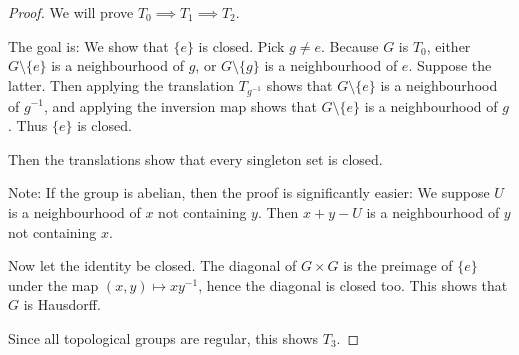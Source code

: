 \documentclass[twoside,symmetric, openany, 12pt]{./tuftebook}
\theoremstyle{definition}
\theoremstyle{definition}
\theoremstyle{definition}
\begin{document}
\begin{proof}
	We will prove $T_0\implies T_1\implies T_2$. 
	
	The goal is: We show that $\{e\}$ is closed. Pick $g\neq e$. Because $G$ is $T_0$, either $G \setminus \{e\}$ is a neighbourhood of $g$, or $G \setminus \{g\}$ is a neighbourhood of $e$. Suppose the latter. Then applying the translation $T_{g^{-1}}$ shows that $G \setminus \{e\}$ is a neighbourhood of $g^{-1}$, and applying the inversion map shows that $G \setminus \{e\}$ is a neighbourhood of $g$. Thus $\{e\}$ is closed.
	
	Then the translations show that every singleton set is closed.
	
	Note: If the group is abelian, then the proof is significantly easier: We suppose $U$ is a neighbourhood of $x$ not containing $y$. Then $x+y-U$ is a neighbourhood of $y$ not containing $x$. 
	
	Now let the identity be closed. The diagonal of $G\times G$ is the preimage of $\{e\}$ under the map $(x,y)\mapsto xy^{-1}$, hence the diagonal is closed too. This shows that $G$ is Hausdorff.
	
	Since all topological groups are regular, this shows $T_3$.
\end{proof}
\end{document}
